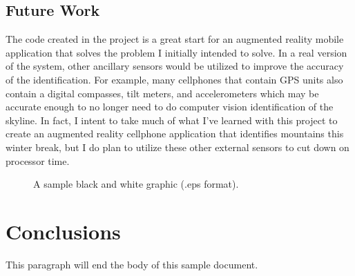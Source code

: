 \documentclass{acm_proc_article-sp}
\begin{document}
\subsection{Future Work}
    The code created in the project is a great start for an augmented reality mobile application that solves the problem I initially intended to solve.  In a real version of the system, other ancillary sensors would be utilized to improve the accuracy of the identification.  For example, many cellphones that contain GPS units also contain a digital compasses, tilt meters, and accelerometers which may be accurate enough to no longer need to do computer vision identification of the skyline.  In fact, I intent to take much of what I’ve learned with this project to create an augmented reality cellphone application that identifies mountains this winter break, but I do plan to utilize these other external sensors to cut down on processor time.





\begin{figure}
\centering
{}
\caption{A sample black and white graphic (.eps format).}
\end{figure}

\section{Conclusions}
This paragraph will end the body of this sample document.



\end{document}
